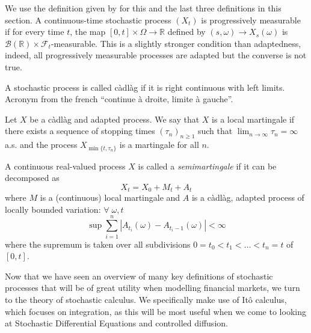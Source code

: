 \begin{definition}
    We use the definition given by \textcite{Pham} for this and the last three definitions 
    in this section.
    A continuous-time stochastic process $(X_t)$ is progressively measurable if
    for every time $t$, the map $[0,t]\times\Omega\rightarrow\mathbb{R}$ defined
    by $(s,\omega)\rightarrow X_s(\omega)$ is $\mathcal{B}(\mathbb{R})\times\mathcal{F}_t$-measurable.
    This is a slightly stronger condition than adaptedness, indeed, all progressively
    measurable processes are adapted but the converse is not true. 
\end{definition}

\begin{definition}[C\`{a}dl\`{a}g process]
    A stochastic process is called c\`{a}dl\`{a}g if it is right continuous with left 
    limits. Acronym from the french ``continue \`{a} droite, limite \`{a} gauche''.
\end{definition}

\begin{definition}
    Let $X$ be a c\`{a}dl\`{a}g and adapted process. We say that $X$ is a local martingale
    if there exists a sequence of stopping times $(\tau_n)_{n\geq1}$ such that 
    $\lim_{n\rightarrow\infty}\tau_n=\infty$ a.s. and the process $X_{\min\{t,\tau_n\}}$
    is a martingale for all $n$.
\end{definition}

\begin{definition}[Semimartingale]
    A continuous real-valued process $X$ is called a \emph{semimartingale} if it can 
    be decomposed as
    \begin{equation}
        X_t = X_0 + M_t + A_t
    \end{equation}
    where $M$ is a (continuous) local martingale and $A$ is a c\`{a}dl\`{a}g, adapted 
    process of locally bounded variation: $\forall\;\omega,t$
    \begin{equation*}
        \sup\sum_{i=1}^n|A_{t_i}(\omega)-A_{t_i-1}(\omega)|<\infty
    \end{equation*}
    where the supremum is taken over all subdivisions $0=t_0<t_1<\dots<t_n=t$ of 
    $[0,t]$.
\end{definition}

Now that we have seen an overview of many key definitions of stochastic processes 
that will be of great utility when modelling financial markets, we turn to the 
theory of stochastic calculus. We specifically make use of It\^{o} calculus, 
which focuses on integration, as this will be most useful when we come to looking 
at Stochastic Differential Equations and controlled diffusion.

